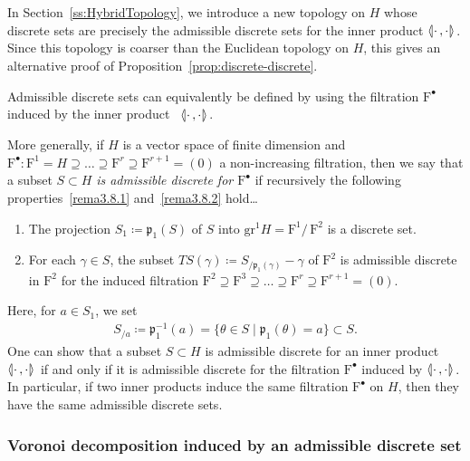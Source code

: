 \documentclass[AHL,Unicode,longabstracts]{cedram}
\newcommand{\llangle}{\mathopen{\langle\mkern -3.1mu\lvert}}
\newcommand{\rrangle}{\mathclose{\rvert\mkern -3.1mu\rangle}}
\newcommand{\highinn}[2]{{\llangle#2\rrangle_{#1}}}
\newcommand{\rquot}[2]{#1/\,#2}
\newcommand{\filter}{\mathrm{F}}
\newcommand{\grm}[2]{\mathrm{gr}_{#1}^{#2}}
\newcommand{\proj}{\mathfrak{p}}
\begin{document}
\begin{rema}
In Section~\ref{ss:HybridTopology}, we introduce a new topology on $H$ whose discrete sets are precisely the admissible discrete sets for the inner product $\highinn{}{\cdot \,, \cdot}$. Since this topology is coarser than the Euclidean topology on $H$, this gives an alternative proof of Proposition~\ref{prop:discrete-discrete}.%
\end{rema}

\begin{rema} \label{rem:AdmissibleDiscreteFiltration}
Admissible discrete sets can equivalently be defined by using the filtration $\filter^\bullet$ induced by the inner product~ $\highinn{}{\cdot \, ,  \cdot}$.%

More generally, if $H$ is a vector space of finite dimension and $\filter^\bullet : \filter^1 = H \supseteq \dots \supseteq \filter^r \supseteq \filter^{r+1}=(0)$ a non-increasing filtration, then we say that a subset $S\subset H$ \emph{is admissible discrete for $\filter^\bullet$} if recursively the following properties~\eqref{rema3.8.1} and~\eqref{rema3.8.2} hold\dots
\begin{enumerate}
\item\label{rema3.8.1} The projection $S_1\coloneqq \proj_1(S)$ of $S$ into $\grm{}{1}H =\rquot{\filter^1}{\filter^2}$ is a discrete set.

\item\label{rema3.8.2} For each $\gamma \in S$, the subset $TS(\gamma) \coloneqq S_{/\proj_1(\gamma)}-\gamma$ of $\filter^2$ is admissible discrete in $\filter^2$ for the induced filtration $\filter^2 \supseteq \filter^3\supseteq \dots \supseteq \filter^r \supseteq \filter^{r+1} =(0)$.
\end{enumerate}
Here, for $a \in S_1$, we set
\begin{align}\label{eq:SOver-filter}
S_{/a} \coloneqq \proj_1^{-1}(a) = \{\theta \in S \mid \proj_1(\theta) = a \} \subset S.
\end{align}
One can show that a subset $S \subset H$ is admissible discrete for an inner product $\highinn{}{\cdot \,, \cdot}$ if and only if it is admissible discrete for the filtration $\filter^\bullet$ induced by $\highinn{}{\cdot \,, \cdot}$. In particular, if two inner products induce the same filtration $\filter^\bullet$ on $H$, then they have the same admissible discrete sets.
\end{rema}

\subsubsection{Voronoi decomposition induced by an admissible discrete set}
\end{document}
